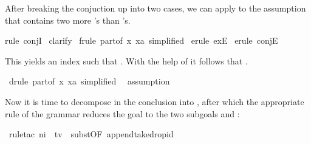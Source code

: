 \begin{isabellebody}
\begin{isamarkuptxt}
After breaking the conjuction up into two cases, we can apply
 to the assumption that  contains two more 's than 's.%
\end{isamarkuptxt}%
rule\ conjI{\isacharparenright}\isanewline
\ clarify{\isacharparenright}\isanewline
\ frule\ part{}{\isacharbrackleft}of\ {\isachardoublequote}{\isasymlambda}x{\isachardot}\ x{\isacharequal}a{\isachardoublequote}{\isacharcomma}\ simplified{\isacharbrackright}{\isacharparenright}\isanewline
\ erule\ exE{\isacharparenright}\isanewline
\ erule\ conjE{\isacharparenright}%
\begin{isamarkuptxt}%
\noindent
This yields an index  such that
.
With the help of  it follows that
.%
\end{isamarkuptxt}%
\ drule\ part{}{\isacharbrackleft}of\ {\isachardoublequote}{\isasymlambda}x{\isachardot}\ x{\isacharequal}a{\isachardoublequote}{\isacharcomma}\ simplified{\isacharbrackright}{\isacharparenright}\isanewline
\ \ assumption{\isacharparenright}%
\begin{isamarkuptxt}%
\noindent
Now it is time to decompose  in the conclusion 
into ,
after which the appropriate rule of the grammar reduces the goal
to the two subgoals  and :%
\end{isamarkuptxt}%
\ rule{\isacharunderscore}tac\ n{}{\isacharequal}i\ \ t{\isacharequal}v\ \ subst{\isacharbrackleft}OF\ append{\isacharunderscore}take{\isacharunderscore}drop{\isacharunderscore}id{\isacharbrackright}{\isacharparenright}\isanewline

\end{isabellebody}

